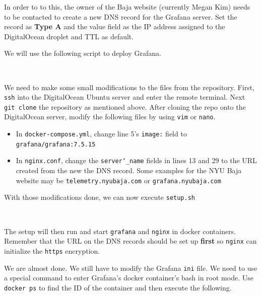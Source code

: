 \documentclass[12pt, letterpaper]{article}
\begin{document}
{{{{{{{{{{{{	In order to to this, the owner of the Baja website (currently Megan Kim) needs to be contacted to create a new DNS record for the Grafana server. Set the record as \textbf{Type A} and the value field as the IP address assigned to the DigitalOcean droplet and TTL as default.
	
	\par We will use the following script to deploy Grafana. \\
	
\par{} \\
	
	\par We need to make some small modifications to the files from the repository. First, \texttt{ssh} into the DigitalOcean Ubuntu server and enter the remote terminal. Next \texttt{git clone} the repository as mentioned above. After cloning the repo onto the DigitalOcean server, modify the following files by using \texttt{vim} or \texttt{nano}.
	\begin{itemize}
		\item In \texttt{docker-compose.yml}, change line 5's \texttt{image:} field to \texttt{grafana/grafana:7.5.15}
		\item In \texttt{nginx.conf}, change the \texttt{server\char`_name} fields in lines 13 and 29 to the URL created from the new the DNS record. Some examples for the NYU Baja website may be \texttt{telemetry.nyubaja.com} or \texttt{grafana.nyubaja.com}
	\end{itemize}

	\par With those modifications done, we can now execute \texttt{setup.sh} \\
	\par{}
	\par{} \\
	
	\par The setup will then run and start \texttt{grafana} and \texttt{nginx} in docker containers. Remember that the URL on the DNS records should be set up \textbf{first} so \texttt{nginx} can initialize the \texttt{https} encryption.

	\par We are almost done. We still have to modify the Grafana \texttt{ini} file. We need to use a special command to enter Grafana's docker container's bash in root mode. Use \texttt{docker ps} to find the ID of the container and then execute the following.
	
}}}}}}}}}}}}
\end{document}
